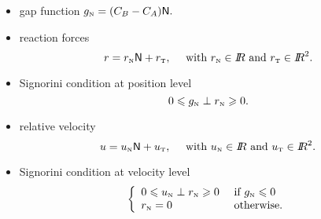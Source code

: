 {\begin{minipage}[c]{0.49\linewidth}
\begin{tikzpicture}
    \end{tikzpicture}
  \end{minipage}
\begin{minipage}[c]{0.49\linewidth}
    \begin{itemize}
    \item gap function $ g_{\n} = (C_B-C_A) \sf N.$
    \item reaction forces $$ r =  r_\n {\sf N} + r_\t, \quad \text{ with  } r_\n \in \RR \text{ and } r_\t \in \RR^2.$$
    \item Signorini condition at position level
      $$  0 \leq g_{\n} \perp r_\n \geq 0. $$
    \item relative velocity
      $$u =  u_\n {\sf N} + u_\t, \quad \text{ with } u_\n \in \RR \text{ and } u_\t \in \RR^2.$$
    \item Signorini condition at velocity level
        $$\left\{\begin{array}{ll}
            0 \leq u_{\n} \perp r_\n \geq 0  &\text{ if } g_{\n} \leq 0 \\
            r_{\n} =0 &\text{ otherwise}.
          \end{array}\right.$$
    \end{itemize}

  \end{minipage}
}
